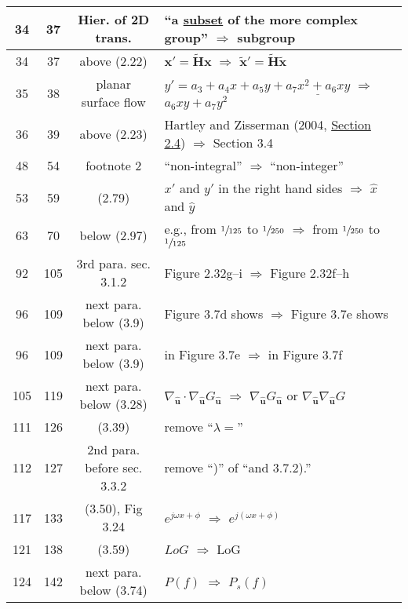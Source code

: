 \documentclass[10pt]{article}
\begin{document}
\begin{tabular}{|c|c|c|l|}
34 & 37 & Hier. of 2D trans. & ``a \underline{subset} of the more complex group'' $\Rightarrow$ subgroup \\\hline
34 & 37 & above (2.22) & $\boldsymbol{x}' = \tilde{\boldsymbol{H}} \boldsymbol{x}$ $\Rightarrow$ $\tilde{\boldsymbol{x}}' = \tilde{\boldsymbol{H}} \tilde{\boldsymbol{x}}$ \\\hline 
35 & 38 & planar surface flow & $y' = a_3 + a_4 x + a_5 y + \underline{a_7 x^2 + a_6 xy}$ $\Rightarrow$  $a_6 xy + a_7 y^2$ \\\hline
36 & 39 & above (2.23) & Hartley and Zisserman (2004, \underline{Section 2.4}) $\Rightarrow$  Section 3.4 \\\hline
48 & 54 & footnote 2 & ``non-integral'' $\Rightarrow$ ``non-integer'' \\\hline
53 & 59 & (2.79) & $x'$ and $y'$ in the right hand sides $\Rightarrow$ $\hat{x}$ and $\hat{y}$ \\\hline
63 & 70 & below (2.97) & e.g., from $\sfrac{1}{125}$ to $\sfrac{1}{250}$ $\Rightarrow$ from $\sfrac{1}{250}$ to $\sfrac{1}{125}$ \\\hline
92   & 105 & 3rd para. sec. 3.1.2 & Figure 2.32g--i $\Rightarrow$ Figure 2.32f--h \\\hline
96   & 109 & next para. below (3.9) & Figure 3.7d shows $\Rightarrow$  Figure 3.7e shows \\\hline
96   & 109 & next para. below (3.9) & in Figure 3.7e $\Rightarrow$ in Figure 3.7f \\\hline
105 & 119 & next para. below (3.28) & $\nabla_{{\mbox{$\boldsymbol{\hat{u}}$}}} \cdot \nabla_{{\mbox{$\boldsymbol{\hat{u}}$}}} G_{{\mbox{$\boldsymbol{\hat{u}}$}}}$
       $\Rightarrow$ 
       $\nabla_{{\mbox{$\boldsymbol{\hat{u}}$}}} G_{{\mbox{$\boldsymbol{\hat{u}}$}}}$
       or
       $\nabla_{{\mbox{$\boldsymbol{\hat{u}}$}}} \nabla_{{\mbox{$\boldsymbol{\hat{u}}$}}} G$
        \\\hline
111 & 126 & (3.39) & remove ``$\lambda = $'' \\\hline
112 & 127 & 2nd para. before sec. 3.3.2 & remove ``)'' of ``and 3.7.2).'' \\\hline
117 & 133 & (3.50), Fig 3.24 & $e^{j \omega x + \phi}$ $\Rightarrow$ $e^{j (\omega x + \phi)}$ \\\hline
121 & 138 & (3.59) & $LoG$ $\Rightarrow$ $\mathrm{LoG}$ \\\hline
124 & 142 & next para. below (3.74) & $P(f)$ $\Rightarrow$ $P_s(f)$ \\\hline

\end{tabular}
\end{document}
